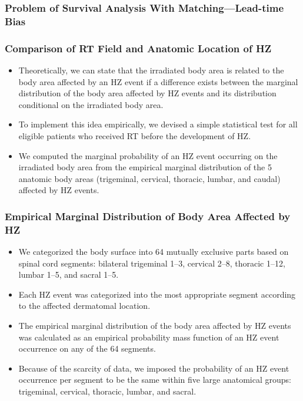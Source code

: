 \documentclass[aspectratio=169, 12pt]{beamer}
\begin{document}
	\begin{frame}
	\frametitle{Problem of Survival Analysis With Matching---Lead-time Bias}
	\end{frame}

	\begin{frame}
	\frametitle{Comparison of RT Field and Anatomic Location of HZ}
	\begin{itemize}
	\item Theoretically, we can state that the irradiated body area is related to the body area affected by an HZ event if a difference exists between the marginal distribution of the body area affected by HZ events and its distribution conditional on the irradiated body area.
	\item To implement this idea empirically, we devised a simple statistical test for all eligible patients who received RT before the development of HZ. 
	\item We computed the marginal probability of an HZ event occurring on the irradiated body area from the empirical marginal distribution of the 5 anatomic body areas (trigeminal, cervical, thoracic, lumbar, and caudal) affected by HZ events.

	\end{itemize}
	\end{frame}

	\begin{frame}
	\frametitle{Empirical Marginal Distribution of Body Area Affected by HZ}
	\begin{itemize}
	\item We categorized the body surface into 64 mutually exclusive parts based on spinal cord segments: bilateral trigeminal 1–3, cervical 2–8, thoracic 1–12, lumbar 1–5, and sacral 1–5.
	\item Each HZ event was categorized into the most appropriate segment according to the affected dermatomal location. 
	\item The empirical marginal distribution of the body area affected by HZ events was calculated as an empirical probability mass function of an HZ event occurrence on any of the 64 segments. 
	\item Because of the scarcity of data, we imposed the probability of an HZ event occurrence per segment to be the same within five large anatomical groups: trigeminal, cervical, thoracic, lumbar, and sacral. 

	\end{itemize}
	\end{frame}
\end{document}
